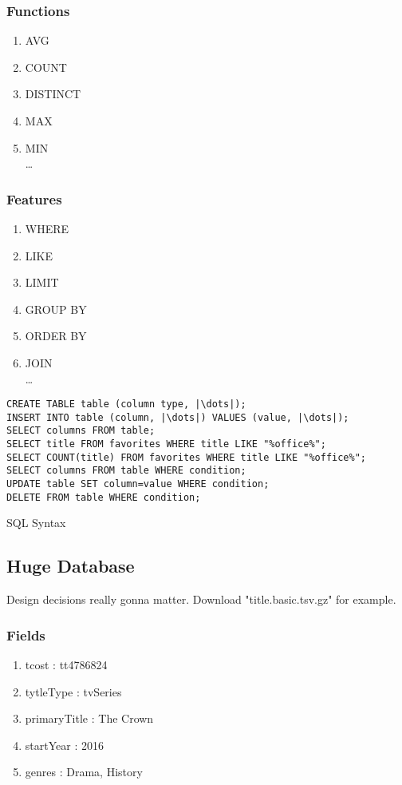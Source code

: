 \subsubsection{Functions}
\begin{enumerate}
	\item AVG
	\item COUNT
	\item DISTINCT
	\item MAX
	\item MIN\\
	      \dots
\end{enumerate}
\subsubsection{Features}
\begin{enumerate}
	\item WHERE
	\item LIKE
	\item LIMIT
	\item GROUP BY
	\item ORDER BY
	\item JOIN\\
	      \dots
\end{enumerate}
\begin{code}
	\begin{verbatim}
CREATE TABLE table (column type, |\dots|);
INSERT INTO table (column, |\dots|) VALUES (value, |\dots|);
SELECT columns FROM table;
SELECT title FROM favorites WHERE title LIKE "%office%";
SELECT COUNT(title) FROM favorites WHERE title LIKE "%office%";
SELECT columns FROM table WHERE condition;
UPDATE table SET column=value WHERE condition;
DELETE FROM table WHERE condition;
	\end{verbatim}
	\caption{SQL Syntax}
\end{code}

\clearpage
\subsection{Huge Database}
Design decisions really gonna matter. Download "title.basic.tsv.gz" for example.
\subsubsection{Fields}
\begin{enumerate}
	\item tcost : tt4786824
	\item tytleType : tvSeries
	\item primaryTitle : The Crown
	\item startYear : 2016
	\item genres : Drama, History
\end{enumerate}

